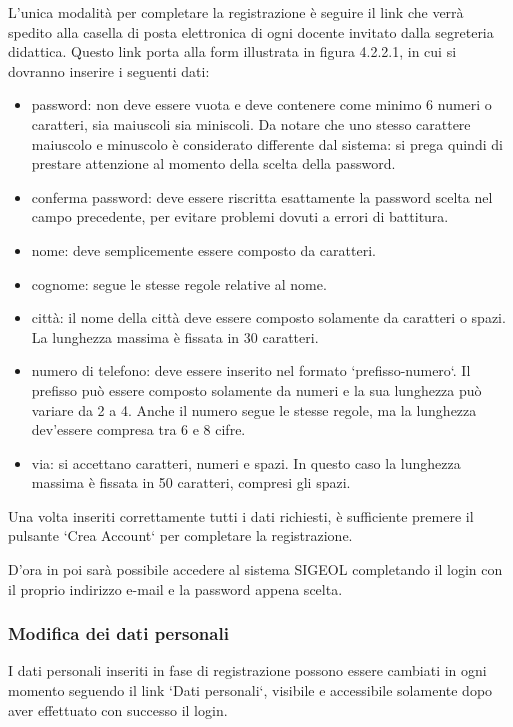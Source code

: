\documentclass[11pt,a4paper]{article}
\begin{document}
L'unica modalità per completare la registrazione è seguire il link che verrà spedito alla casella di posta elettronica di ogni docente invitato dalla segreteria didattica. Questo link porta alla form illustrata in figura 4.2.2.1, in cui si dovranno inserire i seguenti dati:
\begin{itemize}
 \item password: non deve essere vuota e deve contenere come minimo 6 numeri o caratteri, sia maiuscoli sia miniscoli. Da notare che uno stesso carattere maiuscolo e minuscolo è considerato differente dal sistema: si prega quindi di prestare attenzione al momento della scelta della password.
 \item conferma password: deve essere riscritta esattamente la password scelta nel campo precedente, per evitare problemi dovuti a errori di battitura.
 \item nome: deve semplicemente essere composto da caratteri.
 \item cognome: segue le stesse regole relative al nome.
 \item città: il nome della città deve essere composto solamente da caratteri o spazi. La lunghezza massima è fissata in 30 caratteri.
 \item numero di telefono: deve essere inserito nel formato `prefisso-numero`. Il prefisso può essere composto solamente da numeri e la sua lunghezza può variare da 2 a 4. Anche il numero segue le stesse regole, ma la lunghezza dev'essere compresa tra 6 e 8 cifre.
 \item via: si accettano caratteri, numeri e spazi. In questo caso la lunghezza massima è fissata in 50 caratteri, compresi gli spazi.
\end{itemize}
Una volta inseriti correttamente tutti i dati richiesti, è sufficiente premere il pulsante `Crea Account` per completare la registrazione.

D'ora in poi sarà possibile accedere al sistema SIGEOL completando il login con il proprio indirizzo e-mail e la password appena scelta.
\subsubsection{Modifica dei dati personali}
I dati personali inseriti in fase di registrazione possono essere cambiati in ogni momento seguendo il link `Dati personali`, visibile e accessibile solamente dopo aver effettuato con successo il login.
\end{document}

